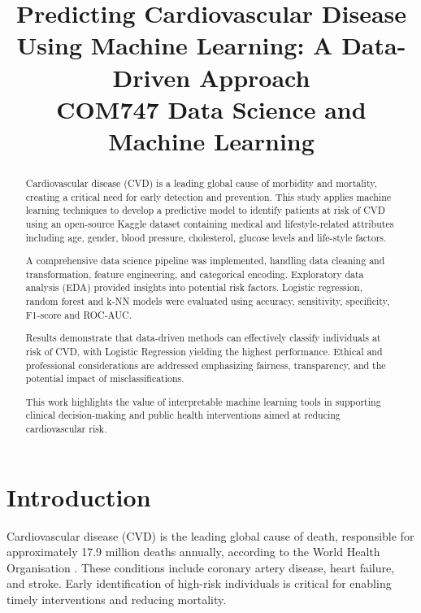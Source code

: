 \documentclass[conference]{IEEEtran}
\begin{document}
\title{Predicting Cardiovascular Disease Using Machine Learning: A Data-Driven Approach \\
{\footnotesize COM747 Data Science and Machine Learning}
}

\author{
\and
{}
\and
{}
\and
{}
}

\maketitle

\begin{abstract}
Cardiovascular disease (CVD) is a leading global cause of morbidity and mortality, creating a critical need for early detection and prevention. This study applies machine learning techniques to develop a predictive model to identify patients at risk of CVD using an open-source Kaggle dataset containing medical and lifestyle-related attributes including age, gender, blood pressure, cholesterol, glucose levels and life-style factors.

A comprehensive data science pipeline was implemented, handling data cleaning and transformation, feature engineering, and categorical encoding. Exploratory data analysis (EDA) provided insights into potential risk factors. Logistic regression, random forest and k-NN models were evaluated using accuracy, sensitivity, specificity, F1-score and ROC-AUC.

Results demonstrate that data-driven methods can effectively classify individuals at risk of CVD, with Logistic Regression yielding the highest performance. Ethical and professional considerations are addressed emphasizing fairness, transparency, and the potential impact of misclassifications.

This work highlights the value of interpretable machine learning tools in supporting clinical decision-making and public health interventions aimed at reducing cardiovascular risk. 
\end{abstract}
\section{Introduction}
Cardiovascular disease (CVD) is the leading global cause of death, responsible for approximately 17.9 million deaths annually, according to the World Health Organisation \cite{WHO}. These conditions include coronary artery disease, heart failure, and stroke. Early identification of high-risk individuals is critical for enabling timely interventions and reducing mortality.
\end{document}
